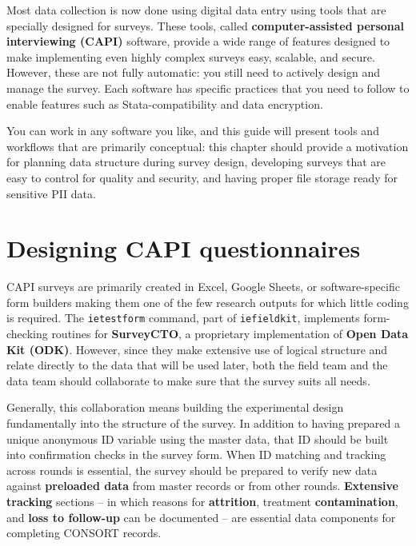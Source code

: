 
\begin{fullwidth}
Most data collection is now done using digital data entry
using tools that are specially designed for surveys.
These tools, called \textbf{computer-assisted personal interviewing (CAPI)} software,
provide a wide range of features designed to make
implementing even highly complex surveys easy, scalable, and secure.
However, these are not fully automatic:
you still need to actively design and manage the survey.
Each software has specific practices that you need to follow
to enable features such as Stata-compatibility and data encryption.

You can work in any software you like,
and this guide will present tools and workflows
that are primarily conceptual:
this chapter should provide a motivation for
planning data structure during survey design,
developing surveys that are easy to control for quality and security,
and having proper file storage ready for sensitive PII data.
\end{fullwidth}


\section{Designing CAPI questionnaires}

CAPI surveys
are primarily created in Excel, Google Sheets,
or software-specific form builders
making them one of the few research outputs for which little coding is required.
The \texttt{ietestform} command, part of
\texttt{iefieldkit}, implements form-checking routines
for \textbf{SurveyCTO}, a proprietary implementation of \textbf{Open Data Kit (ODK)}.
However, since they make extensive use of logical structure and
relate directly to the data that will be used later,
both the field team and the data team should
collaborate to make sure that the survey suits all needs.\cite{krosnick2018questionnaire}

Generally, this collaboration means building the experimental design
fundamentally into the structure of the survey.
In addition to having prepared a unique anonymous ID variable
using the master data,
that ID should be built into confirmation checks in the survey form.
When ID matching and tracking across rounds is essential,
the survey should be prepared to verify new data
against \textbf{preloaded data} from master records or from other rounds.
\textbf{Extensive tracking} sections --
in which reasons for \textbf{attrition}, treatment \textbf{contamination}, and
\textbf{loss to follow-up} can be documented --
are essential data components for completing CONSORT records.\cite{begg1996improving}

